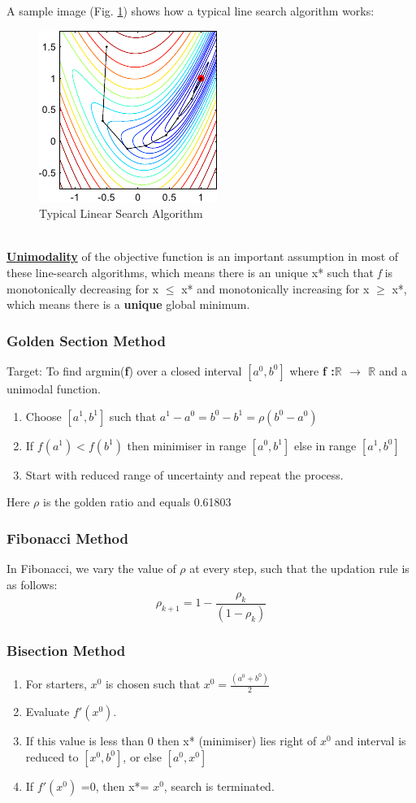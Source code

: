 \documentclass[12pt,a4paper,titlepage]{article}
\begin{document}
A sample image (Fig. \ref{fig1}) shows how a typical line search algorithm works: 
\begin{figure}[h!tb]
	\centering
	\includegraphics[scale=1]{line_searchdemo.png}
	\caption{Typical Linear Search Algorithm} \label{fig1}
\end{figure}
\\
\textbf{\underline{Unimodality}} of the objective function is an important assumption in most of these line-search algorithms, which means there is an unique x* such that \emph{f} is monotonically decreasing for x $\leq$ x* and monotonically increasing for x $\geq$ x*, which means there is a \textbf{unique} global minimum.
\subsubsection{Golden Section Method}
Target: To find argmin(\textbf{f}) over a closed interval $[a^0, b^0]$ where \textbf{f :\textbf{$\mathbb{R}$ $\rightarrow$ $\mathbb{R}$}} and a unimodal function.
\begin{enumerate}
    \item Choose $[a^1, b^1]$ such that $a^1-a^0=b^0-b^1=\rho(b^0-a^0)$
    \item If $f(a^1) < f(b^1)$ then minimiser in range $[a^0, b^1]$ else in range $[a^1,b^0]$
    \item Start with reduced range of uncertainty and repeat the process.
\end{enumerate}
Here $\rho$ is the golden ratio and equals 0.61803
\subsubsection{Fibonacci Method}
In Fibonacci, we vary the value of $\rho$ at every step, such that the updation rule is as follows:
\begin{equation}
   \rho_{k+1}= 1- \frac{\rho_{k}}{(1-\rho_{k})}
\end{equation}
\subsubsection{Bisection Method}
\begin{enumerate}
    \item For starters, $x^0$ is chosen such that $x^0=\frac{(a^0+b^0)}{2}$
    \item Evaluate $f'(x^0)$.
    \item If this value is less than 0 then x* (minimiser) lies right of $x^0$ and interval is reduced to $[x^0, b^0]$, or else $[a^0, x^0]$ 
    \item If $f'(x^0)$ =0, then x*= $x^0$, search is terminated.
\end{enumerate}
\end{document}
